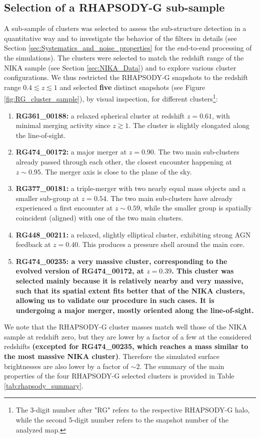 \documentclass[twocolumn,traditabstract]{aa}
\begin{document}
\subsection{Selection of a RHAPSODY-G sub-sample}\label{sec:Selection_of_a_RHAPSODY-G_sub-sample}
A sub-sample of clusters was selected to assess the sub-structure detection in a quantitative way and to investigate the behavior of the filters in details (see Section \ref{sec:Systematics_and_noise_properties} for the end-to-end processing of the simulations). The clusters were selected to match the redshift range of the NIKA sample (see Section \ref{sec:NIKA_Data}) and to explore various cluster configurations. We thus restricted the RHAPSODY-G snapshots to the redshift range $0.4 \lesssim z \lesssim 1$ and selected {\bf five} distinct snapshots (see Figure \ref{fig:RG_cluster_sample}), by visual inspection, for different clusters\footnote{The 3-digit number after "RG" refers to the respective RHAPSODY-G halo, while the second 5-digit number refers to the snapshot number of the analyzed map.}:
\begin{enumerate}
\item {\bf RG361\_00188:} a relaxed spherical cluster at redshift $z = 0.61$, with minimal merging activity since $z \gtrsim 1$. The cluster is slightly elongated along the line-of-sight.
\item {\bf RG474\_00172:} a major merger at $z = 0.90$. The two main sub-clusters already passed through each other, the closest encounter happening at $z \sim 0.95$. The merger axis is close to the plane of the sky. 
\item {\bf RG377\_00181:} a triple-merger with two nearly equal mass objects and a smaller sub-group at $z = 0.54$. The two main sub-clusters have already experienced a first encounter at $z \sim 0.59$, while the smaller group is spatially coincident (aligned) with one of the two main clusters.
\item {\bf RG448\_00211:} a relaxed, slightly elliptical cluster, exhibiting strong AGN feedback at $z = 0.40$. This produces a pressure shell around the main core.
\item {\bf {\bf RG474\_00235:} a very massive cluster, corresponding to the evolved version of RG474\_00172, at $z = 0.39$. This cluster was selected mainly because it is relatively nearby and very massive, such that its spatial extent fits better that of the NIKA clusters, allowing us to validate our procedure in such cases. It is undergoing a major merger, mostly oriented along the line-of-sight.}
\end{enumerate}
We note that the RHAPSODY-G cluster masses match well those of the NIKA sample at redshift zero, but they are lower by a factor of a few at the considered redshifts {\bf (excepted for RG474\_00235, which reaches a mass similar to the most massive NIKA cluster)}. Therefore the simulated surface brightnesses are also lower by a factor of $\sim 2$. The summary of the main properties of the four RHAPSODY-G selected clusters is provided in Table \ref{tab:rhapsody_summary}.
\end{document}
